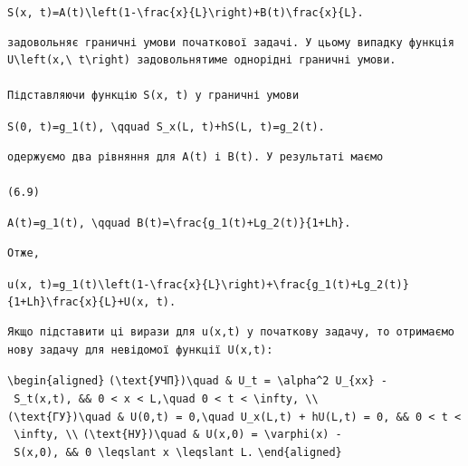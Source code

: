 \documentclass[
  ukrainian,
]{article}
\begin{document}
\texttt{S(x,\ t)=A(t)\textbackslash{}left(1-\textbackslash{}frac\{x\}\{L\}\textbackslash{}right)+B(t)\textbackslash{}frac\{x\}\{L\}.}

\begin{verbatim}
задовольняє граничні умови початкової задачі. У цьому випадку функція U\left(x,\ t\right) задовольнятиме однорідні граничні умови.

Підставляючи функцію S(x, t) у граничні умови
\end{verbatim}

\texttt{S(0,\ t)=g\_1(t),\ \textbackslash{}qquad\ S\_x(L,\ t)+hS(L,\ t)=g\_2(t).}

\begin{verbatim}
одержуємо два рівняння для A(t) і B(t). У результаті маємо

(6.9)
\end{verbatim}

\texttt{A(t)=g\_1(t),\ \textbackslash{}qquad\ B(t)=\textbackslash{}frac\{g\_1(t)+Lg\_2(t)\}\{1+Lh\}.}

\begin{verbatim}
Отже,
\end{verbatim}

\texttt{u(x,\ t)=g\_1(t)\textbackslash{}left(1-\textbackslash{}frac\{x\}\{L\}\textbackslash{}right)+\textbackslash{}frac\{g\_1(t)+Lg\_2(t)\}\{1+Lh\}\textbackslash{}frac\{x\}\{L\}+U(x,\ t).}

\begin{verbatim}
Якщо підставити ці вирази для u(x,t) у початкову задачу, то отримаємо нову задачу для невідомої функції U(x,t):
\end{verbatim}

\texttt{\textbackslash{}begin\{aligned\}}
\texttt{(\textbackslash{}text\{УЧП\})\textbackslash{}quad\ \&\ U\_t\ =\ \textbackslash{}alpha\^{}2\ U\_\{xx\}\ -\ S\_t(x,t),\ \&\&\ 0\ \textless{}\ x\ \textless{}\ L,\textbackslash{}quad\ 0\ \textless{}\ t\ \textless{}\ \textbackslash{}infty,\ \textbackslash{}\textbackslash{}}
\texttt{(\textbackslash{}text\{ГУ\})\textbackslash{}quad\ \&\ U(0,t)\ =\ 0,\textbackslash{}quad\ U\_x(L,t)\ +\ hU(L,t)\ =\ 0,\ \&\&\ 0\ \textless{}\ t\ \textless{}\ \textbackslash{}infty,\ \textbackslash{}\textbackslash{}}
\texttt{(\textbackslash{}text\{НУ\})\textbackslash{}quad\ \&\ U(x,0)\ =\ \textbackslash{}varphi(x)\ -\ S(x,0),\ \&\&\ 0\ \textbackslash{}leqslant\ x\ \textbackslash{}leqslant\ L.}
\texttt{\textbackslash{}end\{aligned\}}
\end{document}
